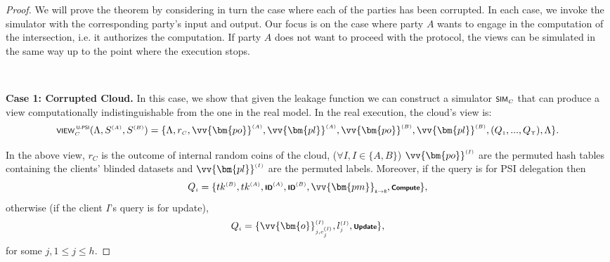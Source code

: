 \begin{proof}
We will prove the theorem by considering in turn the case where each of the parties has been corrupted. In each case, we invoke the simulator with the corresponding party's input and output.  Our focus is on the case where party $A$ wants to engage in the computation of the intersection, i.e. it authorizes the computation. If party $A$ does not want to proceed with the protocol, the views can be simulated in the same way up to the point where the execution stops.


\
\vspace{-2mm}

\noindent\textbf{Case 1: Corrupted Cloud.} In this case, we show that given the leakage function we can construct a simulator $\textsf {\scriptsize SIM}_{\scriptscriptstyle C}$ that can produce a view computationally indistinguishable from the one in the real model. In the real execution, the cloud's view is:
\begin{equation*}
 \textsf {\scriptsize VIEW}^{\scriptscriptstyle\textsf { U-PSI}}_{\scriptscriptstyle C}(\Lambda, S^{\scriptscriptstyle (A)},S^{\scriptscriptstyle (B)})=\{\Lambda, r_{\scriptscriptstyle C}, \vv{\bm{po}}^{\scriptscriptstyle (A)},\vv{\bm{pl}}^{\scriptscriptstyle (A)}, \vv{\bm{po}}^{\scriptscriptstyle (B)},\vv{\bm{pl}}^{\scriptscriptstyle (B)}, (Q_{\scriptscriptstyle  1}, ..., Q_{\scriptscriptstyle  \Upsilon}),\Lambda \}.
\end{equation*}

In the above view, $r_{\scriptscriptstyle C}$ is the outcome of internal random coins of the cloud,  ($\forall I, I\in \{A, B\}$) $\vv{\bm{po}}^{\scriptscriptstyle (I)}$ are the permuted hash tables  containing the clients' blinded datasets and $\vv{\bm{pl}}^{\scriptscriptstyle (I)}$ are the permuted labels. Moreover, if  the query is for PSI delegation then
\begin{equation*}
 Q_{\scriptscriptstyle  i}=\{tk^{\scriptscriptstyle  (B)}, tk^{\scriptscriptstyle  (A)}, \textsf {\scriptsize \textbf{ID}}^{\scriptscriptstyle (A)},  \textsf {\scriptsize \textbf{ID}}^{\scriptscriptstyle (B)},  \vv{\bm{pm}}_{\scriptscriptstyle \mathtt{ A \rightarrow B}}, \textsf {\scriptsize \textbf{Compute}}\},
\end{equation*}
 otherwise (if the client $I$'s query is for update),  
\begin{equation*}
Q_{\scriptscriptstyle  i}=\{\vv{\bm{o}}^{\scriptscriptstyle (I)}_{\scriptscriptstyle j,c^{ {\text{\tiny (\textit{I})}}}_{\tiny j}}, l^{\scriptscriptstyle (I)}_{\scriptscriptstyle j},\textsf {\scriptsize \textbf{Update}}\}, 
\end{equation*}
for some $j, 1\leq j\leq h$.


\end{proof}
